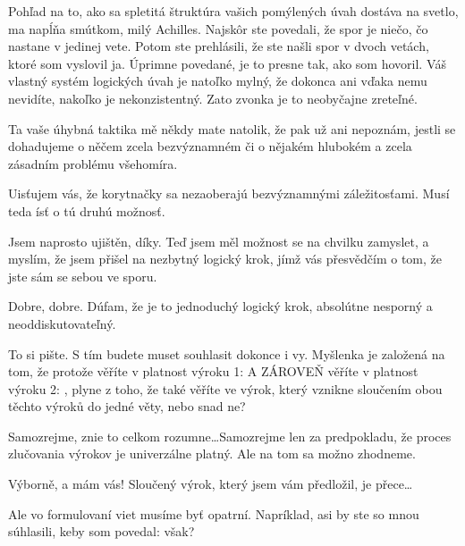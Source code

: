\documentclass[12pt]{article}
\begin{document}
\begin{description}[itemsep=0pt]
\item[Ž:] Pohľad na to, ako sa spletitá štruktúra vašich pomýlených úvah dostáva na svetlo, ma napĺňa smútkom, milý Achilles. Najskôr ste povedali, že spor je niečo, čo nastane v jedinej vete. Potom ste prehlásili, že ste našli spor v dvoch vetách, ktoré som vyslovil ja. Úprimne povedané, je to presne tak, ako som hovoril. Váš vlastný systém logických úvah je natoľko mylný, že dokonca ani vďaka nemu nevidíte, nakoľko je nekonzistentný. Zato zvonka je to neobyčajne zreteľné.

\item[A:] Ta vaše úhybná taktika mě někdy mate natolik, že pak už ani nepoznám,
    jestli se dohadujeme o něčem zcela bezvýznamném či o nějakém hlubokém a zcela
    zásadním problému všehomíra.

\item[Ž:] Uisťujem vás, že korytnačky sa nezaoberajú bezvýznamnými záležitosťami. Musí teda ísť o tú druhú možnosť. 

\item[A:] Jsem naprosto ujištěn, díky. Teď jsem měl možnost se na chvilku
    zamyslet, a myslím, že jsem přišel na nezbytný logický krok, jímž
    vás přesvědčím o tom, že jste sám se sebou ve sporu.

\item[Ž:] Dobre, dobre. Dúfam, že je to jednoduchý logický krok, absolútne nesporný a neoddiskutovateľný.

\item[A:] To si pište. S tím budete muset souhlasit dokonce i vy. Myšlenka
    je založená na tom, že protože věříte v platnost výroku 1:  A ZÁROVEŇ věříte v platnost výroku 2: ,
    plyne z toho, že také věříte ve výrok, který vznikne sloučením obou těchto
    výroků do jedné věty, nebo snad ne?

\item[Ž:] Samozrejme, znie to celkom rozumne\dots Samozrejme len za predpokladu, že proces zlučovania výrokov je univerzálne platný. Ale na tom sa možno zhodneme.

\item[A:] Výborně, a mám vás! Sloučený výrok, který jsem vám předložil,
    je přece…

\item[Ž:] Ale vo formulovaní viet musíme byť opatrní. Napríklad, asi by ste so mnou súhlasili, keby som povedal:  však?


\end{description}
\end{document}

